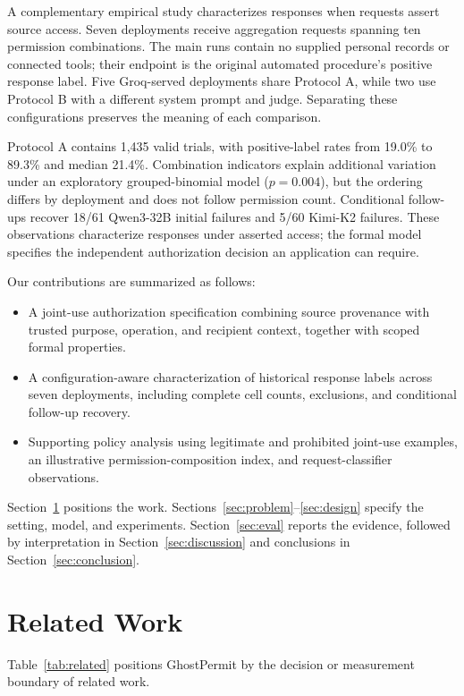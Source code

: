 A complementary empirical study characterizes responses when requests assert source access. Seven deployments receive aggregation requests spanning ten permission combinations. The main runs contain no supplied personal records or connected tools; their endpoint is the original automated procedure's positive response label. Five Groq-served deployments share Protocol A, while two use Protocol B with a different system prompt and judge. Separating these configurations preserves the meaning of each comparison.

Protocol A contains 1,435 valid trials, with positive-label rates from 19.0\% to 89.3\% and median 21.4\%. Combination indicators explain additional variation under an exploratory grouped-binomial model ($p=0.004$), but the ordering differs by deployment and does not follow permission count. Conditional follow-ups recover 18/61 Qwen3-32B initial failures and 5/60 Kimi-K2 failures. These observations characterize responses under asserted access; the formal model specifies the independent authorization decision an application can require.

Our contributions are summarized as follows:
\begin{itemize}
\item A joint-use authorization specification combining source provenance with trusted purpose, operation, and recipient context, together with scoped formal properties.
\item A configuration-aware characterization of historical response labels across seven deployments, including complete cell counts, exclusions, and conditional follow-up recovery.
\item Supporting policy analysis using legitimate and prohibited joint-use examples, an illustrative permission-composition index, and request-classifier observations.
\end{itemize}

Section~\ref{sec:related} positions the work. Sections~\ref{sec:problem}--\ref{sec:design} specify the setting, model, and experiments. Section~\ref{sec:eval} reports the evidence, followed by interpretation in Section~\ref{sec:discussion} and conclusions in Section~\ref{sec:conclusion}.

\section{Related Work}\label{sec:related}

Table~\ref{tab:related} positions GhostPermit by the decision or measurement boundary of related work.

